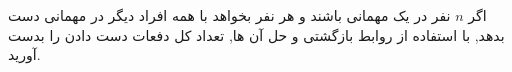\EXERCISE
اگر
$n$
نفر در یک مهمانی باشند و هر نفر بخواهد با همه افراد دیگر در مهمانی دست بدهد, با استفاده از روابط بازگشتی و حل آن ها, تعداد کل دفعات دست دادن را بدست آورید.